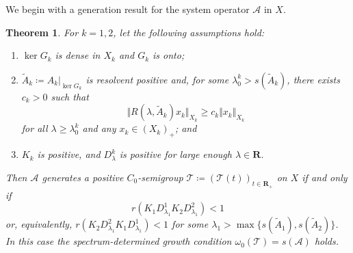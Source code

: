 \documentclass[a4paper,11pt,reqno]{amsart}
\def\calT{{\mathcal{T}}}
\def\calA{{\mathcal{A}}}
\def\R{\mathbf{R}}
\newtheorem{theorem}{Theorem}[section]
\theoremstyle{plain}
\numberwithin{equation}{section}
\begin{document}
We begin with a generation result for the system operator $\mathcal{A}$ in $X$.
\begin{theorem}\label{Result1}
For $k=1,2$, let the following assumptions hold:
\begin{enumerate}[label=\normalfont(\roman*)]
\item\label{cond1} $\ker G_k$ is dense in $X_k$ and ${G}_k$ is onto;
\item\label{cond2} $\tilde{A}_k\coloneqq {A}_k\vert_{\ker {G}_k}$ is resolvent positive and, for some $\lambda_0^k > s(\tilde{A}_k)$, there exists $c_k > 0$ such that
\begin{equation*}
\Vert R(\lambda, \tilde{A}_k)x_k \Vert_{X_k} \geq c_k \Vert x_k \Vert_{X_k}
\end{equation*}
for all $\lambda \ge \lambda_0^k$ and any $x_k \in (X_k)_+$; and
\item\label{cond3} $K_k$ is positive, and $D_\lambda^k$ is positive for large enough $\lambda\in\R$.
\end{enumerate}
Then $\calA$ generates a positive $C_0$-semigroup $\calT\coloneqq (\calT(t))_{t\in\R_+}$ on $X$ if and only if
\begin{equation}\label{spectral.cond}
r(K_1 D_{\lambda_1}^1 K_2 D_{\lambda_1}^2)<1
\end{equation}
or, equivalently, $r(K_2 D_{\lambda_1}^2 K_1 D_{\lambda_1}^1)<1$ for some $\lambda_1>\max\{s(\tilde{A}_1),s(\tilde{A}_2)\}$. In this case the spectrum-determined growth condition $\omega_0(\calT)=s(\mathcal{A})$ holds.
\end{theorem}
\end{document}
